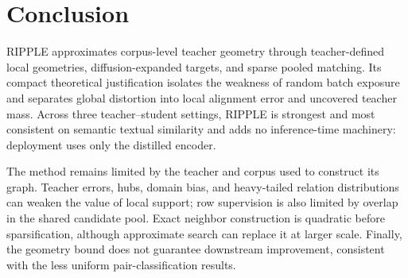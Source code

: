 \section{Conclusion}

RIPPLE approximates corpus-level teacher geometry through teacher-defined local geometries, diffusion-expanded targets, and sparse pooled matching. Its compact theoretical justification isolates the weakness of random batch exposure and separates global distortion into local alignment error and uncovered teacher mass. Across three teacher--student settings, RIPPLE is strongest and most consistent on semantic textual similarity and adds no inference-time machinery: deployment uses only the distilled encoder.

The method remains limited by the teacher and corpus used to construct its graph. Teacher errors, hubs, domain bias, and heavy-tailed relation distributions can weaken the value of local support; row supervision is also limited by overlap in the shared candidate pool. Exact neighbor construction is quadratic before sparsification, although approximate search can replace it at larger scale. Finally, the geometry bound does not guarantee downstream improvement, consistent with the less uniform pair-classification results.
